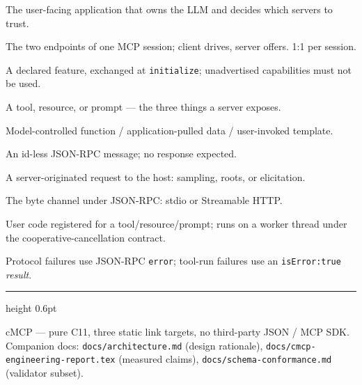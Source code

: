 \documentclass[10pt]{article}
\newcommand{\code}[1]{\texttt{\small #1}}
\begin{document}
\begin{description}[leftmargin=0pt,style=nextline,itemsep=2pt]
  \item[Host] The user-facing application that owns the LLM and decides which
    servers to trust.
  \item[Client / Server] The two endpoints of one MCP session; client drives,
    server offers. 1:1 per session.
  \item[Capability] A declared feature, exchanged at \code{initialize};
    unadvertised capabilities must not be used.
  \item[Primitive] A tool, resource, or prompt --- the three things a server
    exposes.
  \item[Tool / Resource / Prompt] Model-controlled function / application-pulled
    data / user-invoked template.
  \item[Notification] An id-less JSON-RPC message; no response expected.
  \item[Reverse request] A server-originated request to the host: sampling,
    roots, or elicitation.
  \item[Transport] The byte channel under JSON-RPC: stdio or Streamable HTTP.
  \item[Handler] User code registered for a tool/resource/prompt; runs on a
    worker thread under the cooperative-cancellation contract.
  \item[Dual error channel] Protocol failures use JSON-RPC \code{error};
    tool-run failures use an \code{isError:true} \emph{result}.
\end{description}

\vfill
{\color{rulegrey}\hrule height 0.6pt}
\vspace{4pt}
{\small\color{rulegrey}
cMCP --- pure C11, three static link targets, no third-party JSON / MCP SDK.
Companion docs: \code{docs/architecture.md} (design rationale),
\code{docs/cmcp-engineering-report.tex} (measured claims),
\code{docs/schema-conformance.md} (validator subset).}
\end{document}
